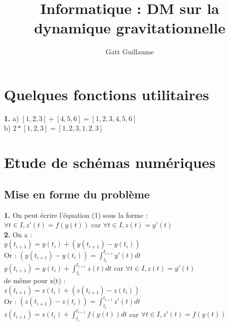 \documentclass{article}
\begin{document}
\title{Informatique : DM sur la dynamique gravitationnelle}
\date{}
\author{Gatt Guillaume}
\maketitle
\renewcommand{\thesection}{\Roman{section}}
	\setlength{\parindent}{1.5cm}
\section{Quelques fonctions utilitaires }
{\bf 1.} a) $[1,2,3] + [4,5,6]=[1,2,3,4,5,6]$ \\
b) $2 *[1,2,3]=[1,2,3,1,2,3]$

\section{Etude de schémas numériques}
\subsection{Mise en forme du problème }
{\bf 1.} On peut écrire l'équation (1) sous la forme : \\
$\forall t \in I, z'(t)=f(y(t))$ car $\forall t \in I, z(t)=y'(t)$ \\
{\bf 2.} On a : \\
$y(t_{i+1})= y(t_i) + (y(t_{i+1}) - y(t_i))$ \\
Or : $(y(t_{i+1}) - y(t_i))=\int_{t_i}^{t_{i+1}}y'(t)dt$ \\
$y(t_{i+1})=y(t_i)+ \int_{t_i}^{t_{i+1}}z(t)dt$ car $\forall t \in I, z(t)=y'(t)$\\
de même pour z(t) : \\
$z(t_{i+1})= z(t_i) + (z(t_{i+1}) - z(t_i))$ \\
Or : $(z(t_{i+1}) - z(t_i))=\int_{t_i}^{t_{i+1}}z'(t)dt$ \\
$z(t_{i+1})=z(t_i)+ \int_{t_i}^{t_{i+1}}f(y(t))dt$ car $\forall t \in I, z'(t)=f(y(t))$
\end{document}
